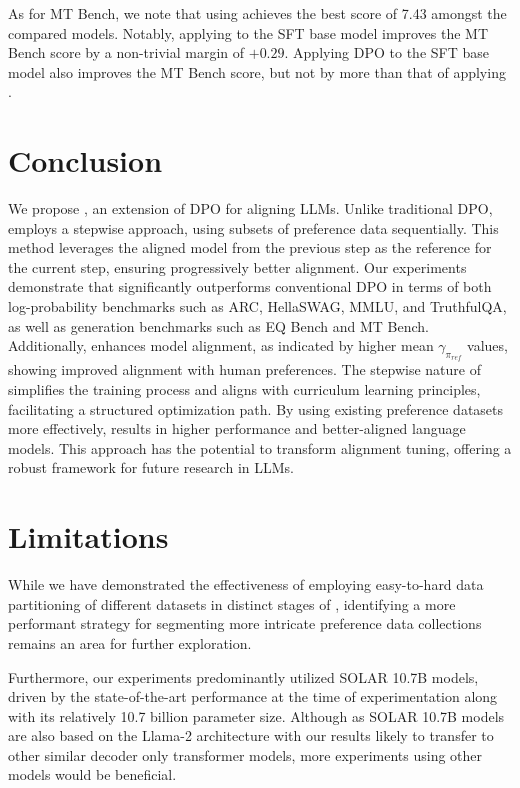 As for MT Bench, we note that using \method achieves the best score of 7.43 amongst the compared models.
Notably, applying \method to the SFT base model improves the MT Bench score by a non-trivial margin of $+0.29$.
Applying DPO to the SFT base model also improves the MT Bench score, but not by more than that of applying \method.

\section{Conclusion}

We propose \method, an extension of DPO for aligning LLMs. Unlike traditional DPO, \method employs a stepwise approach, using subsets of preference data sequentially. This method leverages the aligned model from the previous step as the reference for the current step, ensuring progressively better alignment. Our experiments demonstrate that \method significantly outperforms conventional DPO in terms of both log-probability benchmarks such as ARC, HellaSWAG, MMLU, and TruthfulQA, as well as generation benchmarks such as EQ Bench and MT Bench. Additionally, \method enhances model alignment, as indicated by higher mean $\gamma_{\pi_{ref}}$ values, showing improved alignment with human preferences. The stepwise nature of \method simplifies the training process and aligns with curriculum learning principles, facilitating a structured optimization path. By using existing preference datasets more effectively, \method results in higher performance and better-aligned language models. This approach has the potential to transform alignment tuning, offering a robust framework for future research in LLMs.

\section*{Limitations}
While we have demonstrated the effectiveness of employing easy-to-hard data partitioning of different datasets in distinct stages of \method, identifying a more performant strategy for segmenting more intricate preference data collections remains an area for further exploration.

Furthermore, our experiments predominantly utilized SOLAR 10.7B models, driven by the state-of-the-art performance at the time of experimentation along with its relatively 10.7 billion parameter size.
Although as SOLAR 10.7B models are also based on the Llama-2 architecture with our results likely to transfer to other similar decoder only transformer models, more experiments using other models would be beneficial.

